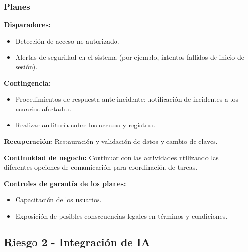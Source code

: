 \documentclass[a4paper,12pt]{article}
\begin{document}
    \subsubsection{Planes}
    \par \textbf{Disparadores:}
    \begin{itemize}
        \item Detección de acceso no autorizado.
        \item Alertas de seguridad en el sistema (por ejemplo, intentos fallidos de inicio de sesión).
    \end{itemize}
    \par \textbf{Contingencia:}
    \begin{itemize}
        \item Procedimientos de respuesta ante incidente: notificación de incidentes a los usuarios afectados.
        \item Realizar auditoría sobre los accesos y registros.
    \end{itemize}
    \par \textbf{Recuperación:} Restauración y validación de datos y cambio de claves.
    \par \textbf{Continuidad de negocio:} Continuar con las actividades utilizando las diferentes opciones de comunicación para coordinación de tareas.
    \par \textbf{Controles de garantía de los planes:}
    \begin{itemize}
        \item Capacitación de los usuarios.
        \item Exposición de posibles consecuencias legales en términos y condiciones.
    \end{itemize}
    \subsection{Riesgo 2 - Integración de IA}
\end{document}
